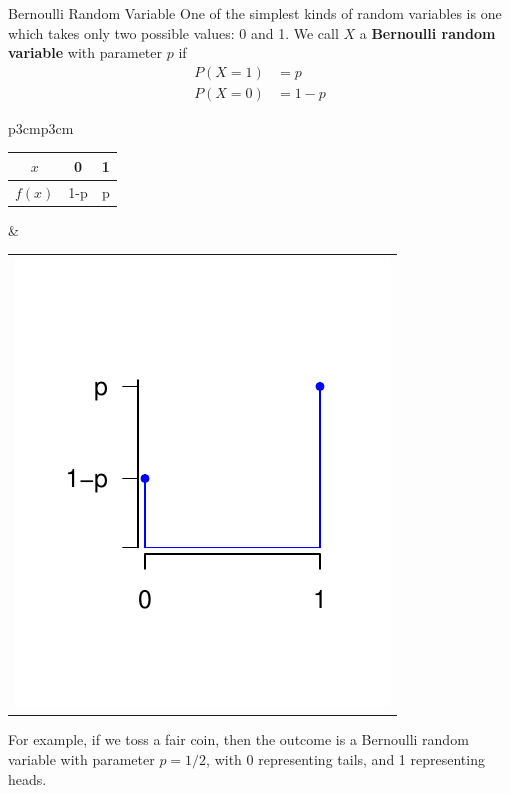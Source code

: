 \documentclass[xcolor=table]{beamer}
\renewcommand{\emph}{\textbf}
\begin{document}
\begin{frame}{Bernoulli Random Variable}
One of the simplest kinds of random variables is one which takes only two possible values: 0 and 1. We call $X$ a \emph{Bernoulli random variable} with parameter $p$ if
\begin{align*}
P(X=1)&= p \\
P(X=0)&= 1-p
\end{align*}

\pause\vspace{-1cm}
\begin{center}
\begin{tabular}{p{3cm}p{3cm}}
\begin{tabular}{c||c|c}
$x$ & 0 & 1 \\ \hline
$f(x)$ & 1-p & p
\end{tabular}
&
\begin{tabular}{c}
\includegraphics[scale=.5]{ch3_pmf3.pdf}
\end{tabular}
\end{tabular}
\end{center}

\pause\vspace{-1cm} For example, if we toss a fair coin, then the outcome is a Bernoulli random variable with parameter $p=1/2$, with 0 representing tails, and 1 representing heads.
\end{frame}
\end{document}
